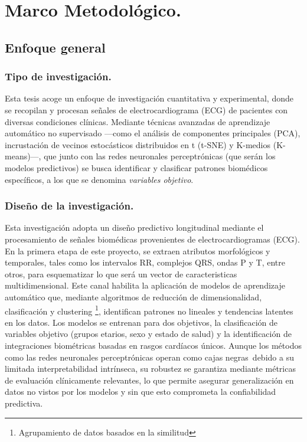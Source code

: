 \documentclass[12pt,letterpaper,oneside,openright]{book}
\begin{document}
\chapter{Marco Metodológico.}

\section{Enfoque general}
\subsection{Tipo de investigación.}

Esta tesis acoge un enfoque de investigación cuantitativa y experimental, donde se recopilan y procesan señales de electrocardiograma (ECG) de pacientes con diversas condiciones clínicas. Mediante técnicas avanzadas de aprendizaje automático no supervisado ---como el análisis de componentes principales (PCA), incrustación de vecinos estocásticos distribuidos en t (t-SNE) y K-medios (K-means)---, que junto con las redes neuronales perceptrónicas (que serán los modelos predictivos) se busca identificar y clasificar patrones biomédicos específicos, a los que se denomina \emph{variables objetivo}.

\subsection{Diseño de la investigación.} \label{subsec:diseno_investigacion}
Esta investigación adopta un diseño predictivo longitudinal mediante el procesamiento de señales biomédicas provenientes de electrocardiogramas (ECG). En la primera etapa de este proyecto, se extraen atributos morfológicos y temporales, tales como los intervalos RR, complejos QRS, ondas P y T, entre otros, para esquematizar lo que será un vector de caracteristicas multidimensional. Este canal habilita la aplicación de modelos de aprendizaje automático que, mediante algoritmos de reducción de dimensionalidad, clasificación y clustering \footnote{Agrupamiento de datos basados en la similitud}, identifican patrones no lineales y tendencias latentes en los datos. Los modelos se entrenan para dos objetivos, la clasificación de variables objetivo (grupos etarios, sexo y estado de salud) y la identificación de integraciones biométricas basadas en rasgos cardíacos únicos. Aunque los métodos como las redes neuronales perceptrónicas operan como \guillemetleft cajas negras\guillemetright \ debido a su limitada interpretabilidad intrínseca, su robustez se garantiza mediante métricas de evaluación clínicamente relevantes, lo que permite asegurar generalización en datos no vistos por los modelos y sin que esto comprometa la confiabilidad predictiva.
\end{document}
